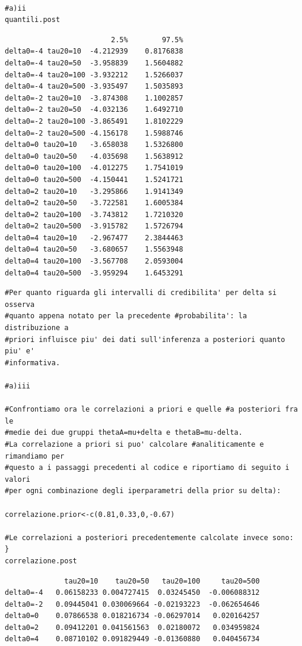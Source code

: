 \begin{itemize}
\begin{lstlisting}[style=R]

#a)ii
quantili.post
\end{lstlisting}
{
\color{red}
\begin{Verbatim}
                         2.5%        97.5%
delta0=-4 tau20=10  -4.212939    0.8176838
delta0=-4 tau20=50  -3.958839    1.5604882
delta0=-4 tau20=100 -3.932212    1.5266037
delta0=-4 tau20=500 -3.935497    1.5035893
delta0=-2 tau20=10  -3.874308    1.1002857
delta0=-2 tau20=50  -4.032136    1.6492710
delta0=-2 tau20=100 -3.865491    1.8102229
delta0=-2 tau20=500 -4.156178    1.5988746
delta0=0 tau20=10   -3.658038    1.5326800
delta0=0 tau20=50   -4.035698    1.5638912
delta0=0 tau20=100  -4.012275    1.7541019
delta0=0 tau20=500  -4.150441    1.5241721
delta0=2 tau20=10   -3.295866    1.9141349
delta0=2 tau20=50   -3.722581    1.6005384
delta0=2 tau20=100  -3.743812    1.7210320
delta0=2 tau20=500  -3.915782    1.5726794
delta0=4 tau20=10   -2.967477    2.3844463
delta0=4 tau20=50   -3.680657    1.5563948
delta0=4 tau20=100  -3.567708    2.0593004
delta0=4 tau20=500  -3.959294    1.6453291
\end{Verbatim}
}


\begin{lstlisting}[style=R]
#Per quanto riguarda gli intervalli di credibilita' per delta si osserva
#quanto appena notato per la precedente #probabilita': la distribuzione a
#priori influisce piu' dei dati sull'inferenza a posteriori quanto piu' e'
#informativa.

#a)iii

#Confrontiamo ora le correlazioni a priori e quelle #a posteriori fra le
#medie dei due gruppi thetaA=mu+delta e thetaB=mu-delta.
#La correlazione a priori si puo' calcolare #analiticamente e rimandiamo per
#questo a i passaggi precedenti al codice e riportiamo di seguito i valori
#per ogni combinazione degli iperparametri della prior su delta):

correlazione.prior<-c(0.81,0.33,0,-0.67)

#Le correlazioni a posteriori precedentemente calcolate invece sono:
}
correlazione.post
\end{lstlisting}

{
\color{red}
\begin{Verbatim}
              tau20=10    tau20=50   tau20=100     tau20=500
delta0=-4   0.06158233 0.004727415  0.03245450  -0.006088312
delta0=-2   0.09445041 0.030069664 -0.02193223  -0.062654646
delta0=0    0.07866538 0.018216734 -0.06297014   0.020164257
delta0=2    0.09412201 0.041561563  0.02180072   0.034959824
delta0=4    0.08710102 0.091829449 -0.01360880   0.040456734
\end{Verbatim}
}



\end{itemize}
